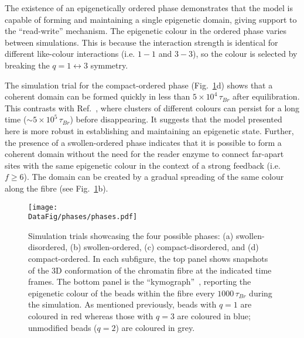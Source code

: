 \documentclass[12pt]{article}
\newcommand*{\DataFig}{/Users/MichaelChiang/Desktop/epigenetics_data/}
\begin{document}
The existence of an epigenetically ordered phase demonstrates that the model is capable of forming and maintaining a single epigenetic domain, giving support to the ``read-write'' mechanism. The epigenetic colour in the ordered phase varies between simulations. This is because the interaction strength is identical for different like-colour interactions (i.e. $1-1$ and $3-3$), so the colour is selected by breaking the $q = 1 \leftrightarrow 3$ symmetry. 

The simulation trial for the compact-ordered phase (Fig.~\ref{fig:phases}d) shows that a coherent domain can be formed quickly in less than $5 \times10^4\,\tau_{Br}$ after equilibration. This contrasts with Ref.~\cite{michieletto2016}, where clusters of different colours can persist for a long time ($\sim5 \times 10^5\,\tau_{Br}$) before disappearing. It suggests that the model presented here is more robust in establishing and maintaining an epigenetic state. Further, the presence of a swollen-ordered phase indicates that it is possible to form a coherent domain without the need for the reader enzyme to connect far-apart sites with the same epigenetic colour in the context of a strong feedback (i.e. $f \ge 6$). The domain can be created by a gradual spreading of the same colour along the fibre (see Fig.~\ref{fig:phases}b).

\pagebreak
\begin{figure}[H]
\centering
\texttt{[image: \\DataFig/phases/phases.pdf]}
\caption{Simulation trials showcasing the four possible phases: (a) swollen-disordered, (b) swollen-ordered, (c) compact-disordered, and (d) compact-ordered. In each subfigure, the top panel shows snapshots of the 3D conformation of the chromatin fibre at the indicated time frames. The bottom panel is the ``kymograph''~\cite{brumley2014}, reporting the epigenetic colour of the beads within the fibre every $1000\,\tau_{Br}$ during the simulation. As mentioned previously, beads with $q = 1$ are coloured in red whereas those with $q = 3$ are coloured in blue; unmodified beads ($q = 2$) are coloured in grey.}
\label{fig:phases}
\end{figure}
\pagebreak
\end{document}
